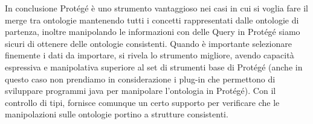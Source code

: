 In conclusione Protégé è uno strumento vantaggioso nei casi in cui si voglia fare il merge tra ontologie mantenendo tutti i concetti rappresentati dalle ontologie di partenza, inoltre manipolando le informazioni con delle Query in Protégé siamo sicuri di ottenere delle ontologie consistenti. Quando è importante selezionare finemente i dati da importare, \cduce si rivela lo strumento migliore, avendo capacità espressiva e manipolativa superiore al set di strumenti base di Protégé (anche in questo caso non prendiamo in considerazione i plug-in che permettono di sviluppare programmi java per manipolare l'ontologia in Protégé). Con il controllo di tipi, \cduce fornisce comunque un certo supporto per verificare che le manipolazioni sulle ontologie portino a strutture consistenti.